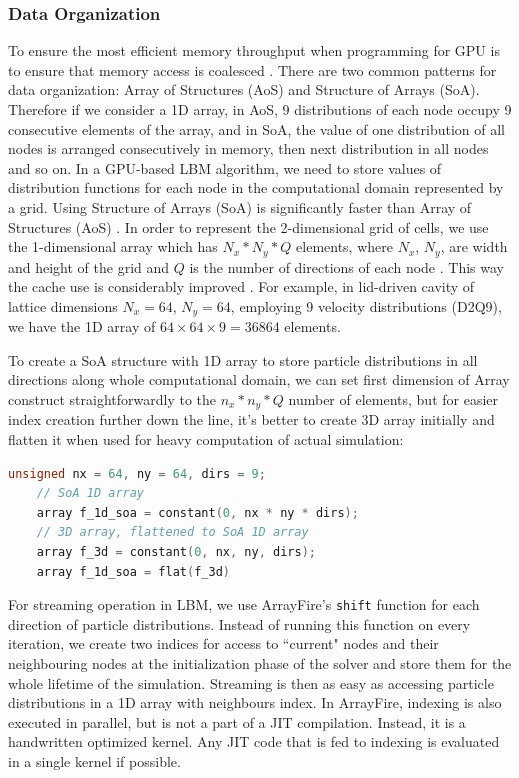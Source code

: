 \subsubsection{Data Organization}
To ensure the most efficient memory throughput when programming for GPU is to ensure that memory access is coalesced \cite{tranPerformanceOptimization3D2017}. There are two common patterns for data organization: Array of Structures (AoS) and Structure of Arrays (SoA). Therefore if we consider a 1D array, in AoS, 9 distributions of each node occupy 9 consecutive elements of the array, and in SoA, the value of one distribution of all nodes is arranged consecutively in memory, then next distribution in all nodes and so on. In a GPU-based LBM algorithm, we need to store values of distribution functions for each node in the computational domain represented by a grid. Using Structure of Arrays (SoA) is significantly faster than Array of Structures (AoS) \cite{tranPerformanceOptimization3D2017, delboscOptimizedImplementationLattice2014}. In order to represent the 2-dimensional grid of cells, we use the 1-dimensional array which has $N_x*N_y*Q$ elements, where $N_x$, $N_y$, are width and height of the grid and $Q$ is the number of directions of each node \cite{tranPerformanceOptimization3D2017}. This way the cache use is considerably improved \cite{Mawson2014InteractiveFI}. For example, in lid-driven cavity of lattice dimensions $N_x=64$, $N_y=64$, employing 9 velocity distributions (D2Q9), we have the 1D array of $64\times64\times9 = 36864$ elements.

To create a SoA structure with 1D array to store particle distributions in all directions along whole computational domain, we can set first dimension of Array construct straightforwardly to the $n_x*n_y*Q$ number of elements, but for easier index creation further down the line, it's better to create 3D array initially and flatten it when used for heavy computation of actual simulation:

\begin{lstlisting}[language=Cpp, caption=Creating SoA structure representation of D2Q9 lattice with ArrayFire in C++.]
	unsigned nx = 64, ny = 64, dirs = 9;
	// SoA 1D array
	array f_1d_soa = constant(0, nx * ny * dirs);
	// 3D array, flattened to SoA 1D array
	array f_3d = constant(0, nx, ny, dirs);
	array f_1d_soa = flat(f_3d)
\end{lstlisting}

For streaming operation in LBM, we use ArrayFire's \texttt{shift} function for each direction of particle distributions. Instead of running this function on every iteration, we create two indices for access to ``current" nodes and their neighbouring nodes at the initialization phase of the solver and store them for the whole lifetime of the simulation. Streaming is then as easy as accessing particle distributions in a 1D array with neighbours index. In ArrayFire, indexing is also executed in parallel, but is not a part of a JIT compilation. Instead, it is a handwritten optimized kernel. Any JIT code that is fed to indexing is evaluated in a single kernel if possible.


